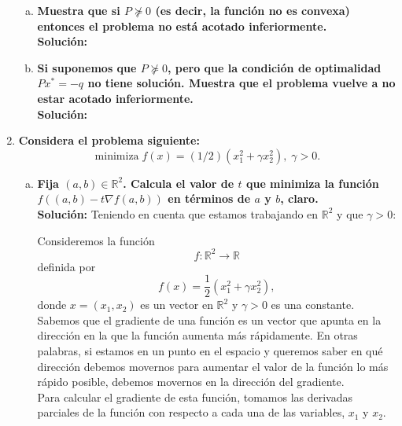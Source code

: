 \begin{enumerate}
    \begin{enumerate}[(a)]

	\item \textbf{\boldmath Muestra que si $P \nsucceq 0$ (es decir, la función no es convexa) entonces el problema no está acotado inferiormente.}\\

	    \textbf{Solución:}

	\item \textbf{\boldmath Si suponemos que $P \nsucceq 0$, pero que la condición de optimalidad $Px^* = -q$ no tiene solución. Muestra que el problema vuelve a no estar acotado inferiormente.}\\

	    \textbf{Solución:}

    \end{enumerate}

    \item \textbf{\boldmath Considera el problema siguiente:
    $$\text{minimiza} \; f(x)=(1/2)\left(x_1^2+\gamma x^2_2\right),\; \gamma >0.$$} 
    \begin{enumerate}[(a)]

	\item \textbf{\boldmath Fija $(a,b)\in \mathbb{R}^2$. Calcula el valor de $t$ que minimiza la función $f\left((a,b)-t\nabla f(a,b)\right)$ en términos de $a$ y $b$, claro.}\\ 

	    \textbf{Solución:} Teniendo en cuenta que estamos trabajando en $\mathbb{R}^2$ y que $\gamma > 0$:

	    Consideremos la función $$f: \mathbb{R}^2 \rightarrow \mathbb{R}$$ definida por $$f(x) = \frac{1}{2}(x_1^2 + \gamma x_2^2),$$ donde $x = (x_1, x_2)$ es un vector en $\mathbb{R}^2$ y $\gamma > 0$ es una constante.\\

	    Sabemos que el gradiente de una función es un vector que apunta en la dirección en la que la función aumenta más rápidamente. En otras palabras, si estamos en un punto en el espacio y queremos saber en qué dirección debemos movernos para aumentar el valor de la función lo más rápido posible, debemos movernos en la dirección del gradiente.\\

	    Para calcular el gradiente de esta función, tomamos las derivadas parciales de la función con respecto a cada una de las variables, $x_1$ y $x_2$. 


\end{enumerate}
\end{enumerate}
